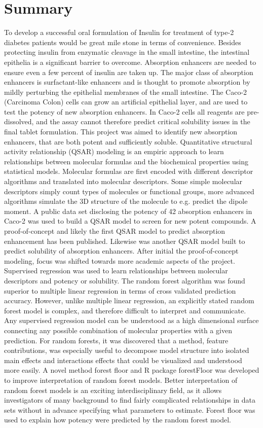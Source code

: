 \chapter{Summary}
To develop a successful oral formulation of Insulin for treatment of type-2 diabetes patients would be great mile stone in terms of convenience. Besides protecting insulin from enzymatic cleavage in the small intestine, the intestinal epithelia is a significant barrier to overcome. Absorption enhancers are needed to ensure even a few percent of insulin are taken up. The major class of absorption enhancers is surfactant-like enhancers and is thought to promote absorption by mildly perturbing the epithelial membranes of the small intestine. The Caco-2 (Carcinoma Colon) cells can grow an artificial epithelial layer, and are used to test the potency of new absorption enhancers. In Caco-2 cells all reagents are pre-dissolved, and the assay cannot therefore predict critical solubility issues in the final tablet formulation. This project was aimed to identify new absorption enhancers, that are both potent and sufficiently soluble. Quantitative structural activity relationship (QSAR) modeling is an empiric approach to learn relationships between molecular formulas and the biochemical properties using statistical models. Molecular formulas are first encoded with different descriptor algorithms and translated into molecular descriptors. Some simple molecular descriptors simply count types of molecules or functional groups, more advanced algorithms simulate the 3D structure of the molecule to e.g. predict the dipole moment.
A public data set disclosing the potency of 42 absorption enhancers in Caco-2 was used to build a QSAR model to screen for new potent compounds. A proof-of-concept and likely the first QSAR model to predict absorption enhancement has been published. Likewise was another QSAR model built to predict solubility of absorption enhancers. After initial the proof-of-concept modeling, focus was shifted towards more academic aspects of the project. Supervised regression was used to learn relationships between molecular descriptors and potency or solubility. The random forest algorithm was found superior to multiple linear regression in terms of cross validated prediction accuracy. However, unlike multiple linear regression, an explicitly stated random forest model is complex, and therefore difficult to interpret and communicate. Any supervised regression model can be understood as a high dimensional surface connecting any possible combination of molecular properties with a given prediction. For random forests, it was discovered that a method, feature contributions, was especially useful to decompose model structure into isolated main effects and interactions effects that could be visualized and understood more easily. A novel method forest floor and R package forestFloor was developed to improve interpretation of random forest models. Better interpretation of random forest models is an exciting interdisciplinary field, as it allows investigators of many background to find fairly complicated relationships in data sets without in advance specifying what parameters to estimate. Forest floor was used to explain how potency were predicted by the random forest model.